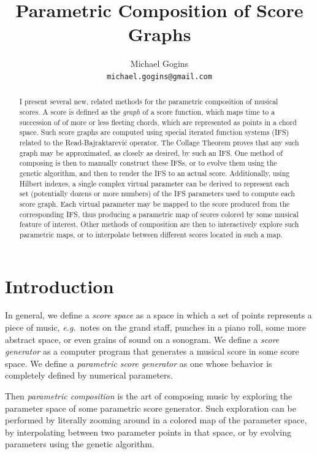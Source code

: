 \documentclass[english,11pt,letterpaper,onecolumn]{scrartcl}
\numberwithin{equation}{section}
\begin{document}
\title{Parametric Composition of Score Graphs}
\author{Michael Gogins \\ \texttt{michael.gogins@gmail.com}}
\maketitle

\begin{abstract}
I present several new, related methods for the parametric composition of musical
scores. A score is defined as the \textit{graph} of a score function, which maps 
time to a succession of of more or less fleeting chords, which are represented as 
points in a chord space. 
Such score graphs are computed using special iterated function systems (IFS) related
to the Read-Bajraktarevi\'c operator. The Collage Theorem proves that any such
graph may be approximated, as closely as desired, by such an IFS. One method of
composing is then to manually construct these IFSs, or to evolve them using the
genetic algorithm, and then to render the IFS to an actual score. Additionally,
using Hilbert indexes, a single complex virtual parameter can be derived to
represent each set (potentially dozens or more numbers) of the IFS parameters
used to compute each score graph. Each virtual parameter may be mapped to the
score produced from the corresponding IFS, thus producing a parametric map of
scores colored by some musical feature of interest. Other methods of composition
are then to interactively explore such parametric maps, or to interpolate between
different scores located in such a map.
\end{abstract}


\section{Introduction}

In general, we define a \textit{score space} as a space in which a set of points represents
a piece of music, \textit{e.g.}\ notes on the grand staff, punches in a piano
roll, some more abstract space, or even grains of sound on a sonogram. We
define a \textit{score generator} as a computer program that generates a
musical score in some score space. We define a \textit{parametric score
generator} as one whose behavior is completely defined by numerical parameters.

Then \textit{parametric composition} is the art of composing music by exploring
the parameter space of some parametric score generator. Such exploration can be
performed by literally zooming around in a colored map of the parameter space,
by interpolating between two parameter points in that space, or by evolving
parameters using the genetic algorithm.
\end{document}
